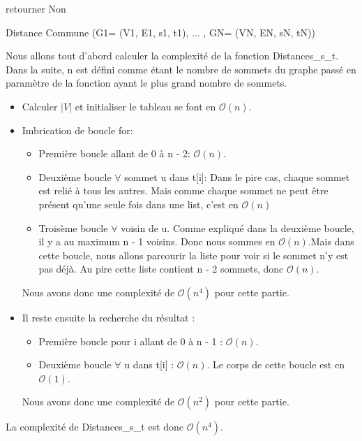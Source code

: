 \documentclass{article}
\begin{document}
\begin{enumerate}
\begin{algorithm}
{    
}
\BlankLine

retourner Non\;
\caption{Distance Commune (G1= (V1, E1, s1, t1), ... , GN= (VN, EN, sN, tN))}
\end{algorithm}
Nous allons tout d'abord calculer la complexité de la fonction Distances\_s\_t. Dans la suite, n est défini comme étant le nombre de sommets du graphe passé en paramètre de la fonction ayant le plus grand nombre de sommets.
\begin{itemize}
    \item 
    Calculer $|V|$ et initialiser le tableau se font en $\mathcal{O}(n)$.
    \item
    Imbrication de boucle for:
    \begin{itemize}
        \item 
        Première boucle allant de 0 à n - 2: $\mathcal{O}(n)$.
        \item
        Deuxième boucle $\forall$ sommet u dans t[i]:\newline
        Dans le pire cas, chaque sommet est relié à tous les autres. Mais comme chaque sommet ne peut être présent qu'une seule fois dans une list, c'est en $\mathcal{O}(n)$
        \item
        Troisème boucle $\forall$ voisin de u. Comme expliqué dans la deuxième boucle, il y a au maximum n - 1 voisins. Donc nous sommes en $\mathcal{O}(n)$.\newline Mais dans cette boucle, nous allons parcourir la liste pour voir si le sommet n'y est pas déjà. Au pire cette liste contient n - 2 sommets, donc $\mathcal{O}(n)$.
    \end{itemize}
    Nous avons donc une complexité de $\mathcal{O}(n^4)$ pour cette partie. 
    \item
    Il reste ensuite la recherche du résultat : 
    \begin{itemize}
        \item 
        Première boucle pour i allant de 0 à n - 1 : $\mathcal{O}(n)$.
        \item
        Deuxième boucle $\forall$ u dans t[i] : $\mathcal{O}(n)$. Le corps de cette boucle est en $\mathcal{O}(1)$.
    \end{itemize}
    Nous avons donc une complexité de $\mathcal{O}(n^2)$ pour cette partie.
\end{itemize}
La complexité de Distances\_s\_t est donc $\mathcal{O}(n^4)$.


\end{enumerate}
\end{document}
